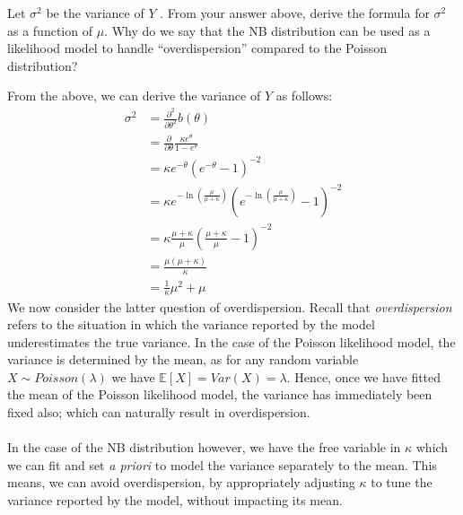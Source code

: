 \documentclass[nocolor]{report}
\begin{document}
\begin{ex}[Question 3b] 
    Let $\sigma^2$ be the variance of $Y$ . From your answer above, derive the formula for $\sigma^2$ as a function of $\mu$. Why do we say that the NB distribution can be used as a likelihood model to handle “overdispersion” compared to the Poisson distribution?
\end{ex}
\vspace{-10pt}
\begin{soln}
    From the above, we can derive the variance of $Y$ as follows: 
    \begin{align*} \sigma^2 & =\frac{\partial^2}{\partial \theta^2} b(\theta) \\ 
    & =\frac{\partial}{\partial \theta} \frac{\kappa e^\theta}{1-e^\theta} \\ 
    & =\kappa e^{-\theta}\left(e^{-\theta}-1\right)^{-2} \\ & =\kappa e^{-\ln \left(\frac{\mu}{\mu+\kappa}\right)}\left(e^{-\ln \left(\frac{\mu}{\mu+\kappa}\right)}-1\right)^{-2} \\ & =\kappa \frac{\mu+\kappa}{\mu}\left(\frac{\mu+\kappa}{\mu}-1\right)^{-2} \\ & =\frac{\mu(\mu+\kappa)}{\kappa} \\ & =\frac{1}{\kappa} \mu^2+\mu\end{align*}
    We now consider the latter question of overdispersion. Recall that \textit{overdispersion} refers to the situation in which the variance reported by the model underestimates the true variance. In the case of the Poisson likelihood model, the variance is determined by the mean, as for any random variable $X\sim Poisson(\lambda)$ we have 
$\mathbb{E}[X] = Var(X) = \lambda$. Hence, once we have fitted the mean of the Poisson likelihood model, the variance has immediately been fixed also; which can naturally result in overdispersion.\\
\\
In the case of the NB distribution  however, we have the free variable in $\kappa$ which we can fit and set \textit{a priori} to model the variance separately to the mean. This means, we can avoid overdispersion, by appropriately adjusting $\kappa$ to tune the variance reported by the model, without impacting its mean.
\end{soln}
\end{document}
